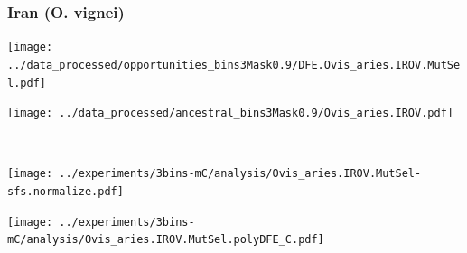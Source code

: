 \subsubsection{Iran (O. vignei)}

\begin{minipage}{0.49\linewidth}
    \texttt{[image: ../data\_processed/opportunities\_bins3Mask0.9/DFE.Ovis\_aries.IROV.MutSel.pdf]}
\end{minipage}
\begin{minipage}{0.49\linewidth}
    \texttt{[image: ../data\_processed/ancestral\_bins3Mask0.9/Ovis\_aries.IROV.pdf]}
\end{minipage}
\\
\begin{minipage}{0.49\linewidth}
    \texttt{[image: ../experiments/3bins-mC/analysis/Ovis\_aries.IROV.MutSel-sfs.normalize.pdf]}
\end{minipage}
\begin{minipage}{0.4\linewidth}
    \texttt{[image: ../experiments/3bins-mC/analysis/Ovis\_aries.IROV.MutSel.polyDFE\_C.pdf]}
\end{minipage}
